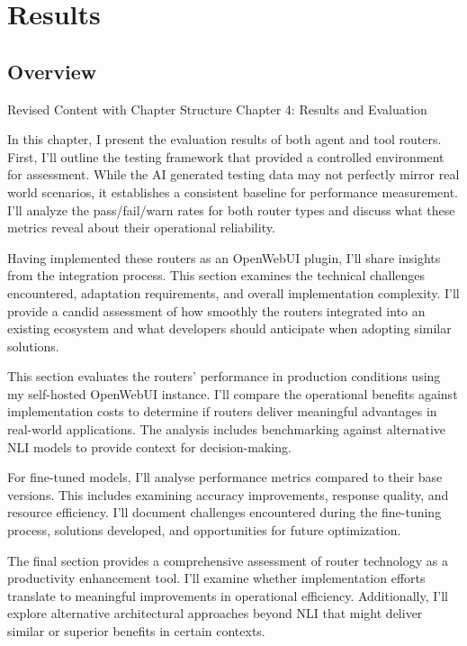 \chapter{Results}
\label{chap:results}

\section{Overview}
\label{sec:results-overview}


Revised Content with Chapter Structure
Chapter 4: Results and Evaluation

In this chapter, I present the evaluation results of both agent and tool routers. First, I'll outline the testing framework that provided a controlled environment for assessment. While the AI generated testing data may not perfectly mirror real world scenarios, it establishes a consistent baseline for performance measurement. I'll analyze the pass/fail/warn rates for both router types and discuss what these metrics reveal about their operational reliability.

Having implemented these routers as an OpenWebUI plugin, I'll share insights from the integration process. This section examines the technical challenges encountered, adaptation requirements, and overall implementation complexity. I'll provide a candid assessment of how smoothly the routers integrated into an existing ecosystem and what developers should anticipate when adopting similar solutions.

This section evaluates the routers' performance in production conditions using my self-hosted OpenWebUI instance. I'll compare the operational benefits against implementation costs to determine if routers deliver meaningful advantages in real-world applications. The analysis includes benchmarking against alternative NLI models to provide context for decision-making.

For fine-tuned models, I'll analyse performance metrics compared to their base versions. This includes examining accuracy improvements, response quality, and resource efficiency. I'll document challenges encountered during the fine-tuning process, solutions developed, and opportunities for future optimization.

The final section provides a comprehensive assessment of router technology as a productivity enhancement tool. I'll examine whether implementation efforts translate to meaningful improvements in operational efficiency. Additionally, I'll explore alternative architectural approaches beyond NLI that might deliver similar or superior benefits in certain contexts.


